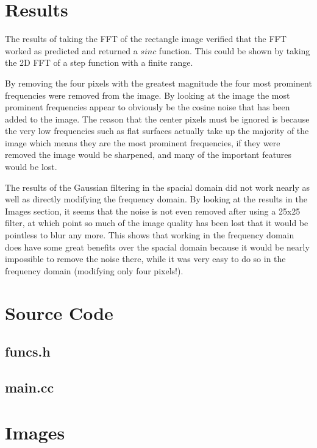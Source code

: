 \section{Results}

  The results of taking the FFT of the rectangle image verified that the FFT worked as predicted and returned a $sinc$ function.  This
could be shown by taking the 2D FFT of a step function with a finite range.

  By removing the four pixels with the greatest magnitude the four most prominent frequencies were removed from the image.  By looking
  at the image the most prominent frequencies appear to obviously be the cosine noise that has been added to the image.  The reason that
  the center pixels must be ignored is because the very low frequencies such as flat surfaces actually take up the majority of the image
  which means they are the most prominent frequencies, if they were removed the image would be sharpened, and many of the important features
  would be lost.

  The results of the Gaussian filtering in the spacial domain did not work nearly as well as directly modifying the frequency domain.  By
  looking at the results in the Images section, it seems that the noise is not even removed after using a 25x25 filter, at which point
  so much of the image quality has been lost that it would be pointless to blur any more.  This shows that working in the frequency 
  domain does have some great benefits over the spacial domain because it would be nearly impossible to remove the noise there, while
  it was very easy to do so in the frequency domain (modifying only four pixels!).

\newpage

\section{Source Code}
  \subsection{funcs.h}
    
  \subsection{main.cc}
    
%    
\section{Images}
  
